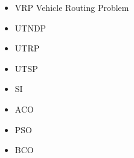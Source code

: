 \begin{itemize}
\item[ ] VRP Vehicle Routing Problem
\item[ ] UTNDP
\item[ ] UTRP
\item[ ] UTSP
\item[ ] SI
\item[ ] ACO
\item[ ] PSO
\item[ ] BCO
\end{itemize}